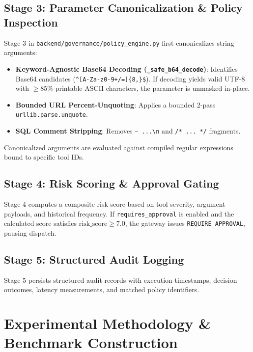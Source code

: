 \documentclass[10pt,twocolumn,letterpaper]{article}
\begin{document}
\subsection{Stage 3: Parameter Canonicalization \& Policy Inspection}
Stage 3 in \texttt{backend/governance/policy\_engine.py} first canonicalizes string arguments:
\begin{itemize}
    \item \textbf{Keyword-Agnostic Base64 Decoding (\texttt{\_safe\_b64\_decode})}: Identifies Base64 candidates (\texttt{\^{}[A-Za-z0-9+/=]\{8,\}\$}). If decoding yields valid UTF-8 with $\ge 85\%$ printable ASCII characters, the parameter is unmasked in-place.
    \item \textbf{Bounded URL Percent-Unquoting}: Applies a bounded 2-pass \texttt{urllib.parse.unquote}.
    \item \textbf{SQL Comment Stripping}: Removes \texttt{-- ...\textbackslash n} and \texttt{/* ... */} fragments.
\end{itemize}
Canonicalized arguments are evaluated against compiled regular expressions bound to specific tool IDs.

\subsection{Stage 4: Risk Scoring \& Approval Gating}
Stage 4 computes a composite risk score based on tool severity, argument payloads, and historical frequency. If \texttt{requires\_approval} is enabled and the calculated score satisfies $\text{risk\_score} \ge 7.0$, the gateway issues \texttt{REQUIRE\_APPROVAL}, pausing dispatch.

\subsection{Stage 5: Structured Audit Logging}
Stage 5 persists structured audit records with execution timestamps, decision outcomes, latency measurements, and matched policy identifiers.

\section{Experimental Methodology \& Benchmark Construction}
\end{document}

